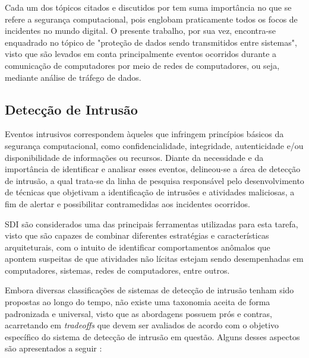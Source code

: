 Cada um dos tópicos citados e discutidos por  tem suma importância no que se refere a segurança computacional, pois englobam praticamente todos os focos de incidentes no mundo digital. O presente trabalho, por sua vez, encontra-se enquadrado no tópico de "proteção de dados sendo transmitidos entre sistemas", visto que são levados em conta principalmente eventos ocorridos durante a comunicação de computadores por meio de redes de computadores, ou seja, mediante análise de tráfego de dados.

\begin{comment}
\subsection{Tipos de Ameaças}
\label{Sec:subsecoes}

Tipos de ataques interessantes de abordar:
DoS (Comentar que podem ser utilizadas várias ferramentas: HULK, GoldenEye, Slowloris)
Brute Force (Citando Patator, que oferece suporte pra vários serviços, mas focar em SSH e FTP que estão presentes na CICIDS2017)
PortScan
Botnet
Infiltration (iciss20140_submission_35.pdf downloads)

\end{comment}

\subsection{Detecção de Intrusão}
\label{Sec:figuras}

Eventos intrusivos correspondem àqueles que infringem princípios básicos da segurança computacional, como confidencialidade, integridade, autenticidade e/ou disponibilidade de informações ou recursos. Diante da necessidade e da importância de identificar e analisar esses eventos, delineou-se a área de detecção de intrusão, a qual trata-se da linha de pesquisa responsável pelo desenvolvimento de técnicas que objetivam a identificação de intrusões e atividades maliciosas, a fim de alertar e possibilitar contramedidas aos incidentes ocorridos.

SDI são considerados uma das principais ferramentas utilizadas para esta tarefa, visto que são capazes de combinar diferentes estratégias e características arquiteturais, com o intuito de  identificar comportamentos anômalos que apontem suspeitas de que atividades não lícitas estejam sendo desempenhadas em computadores, sistemas, redes de computadores, entre outros.

Embora diversas classificações de sistemas de detecção de intrusão tenham sido propostas ao longo do tempo, não existe uma taxonomia aceita de forma padronizada e universal, visto que as abordagens possuem prós e contras, acarretando em \textit{tradeoffs} que devem ser avaliados de acordo com o objetivo específico do sistema de detecção de intrusão em questão. Alguns desses aspectos são apresentados a seguir \cite{lazarevic2005}:

